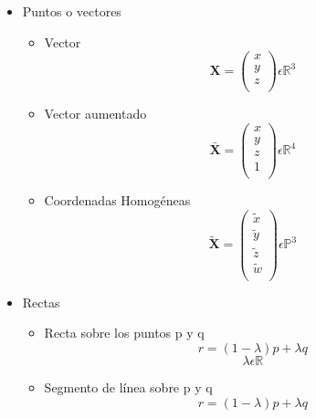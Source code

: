 \documentclass[main.tex]{subfiles}
\begin{document}
\begin{itemize}
\item Puntos o vectores
  \begin{itemize}
  \item Vector
    \begin{equation}
      \mathbf{X} = \left(
      \begin{array}{ccc}x \\y \\z \\\end{array} \right)
      \epsilon \mathbb{R}^{3}
    \end{equation}
  \item Vector aumentado
    \begin{equation}
      \mathbf{\bar{X}} = \left(
          \begin{array}{ccc}x \\y \\z \\1 \\
          \end{array}        \right) \epsilon \mathbb{R}^{4}
    \end{equation}
  \item Coordenadas Homogéneas
    \begin{equation}
      \mathbf{\tilde{X}} = \left(
          \begin{array}{ccc}
            \tilde{x} \\ \tilde{y} \\ \tilde{z} \\ \tilde{w} \\
          \end{array}
        \right) \epsilon \mathbb{P}^{3}
    \end{equation}
  \end{itemize}
\item Rectas
  \begin{itemize}
  \item Recta sobre los puntos p y q
    \begin{equation}
      r = (1-\lambda )p+\lambda q
    \end{equation}
    \begin{equation}
      \lambda \epsilon \mathbb{R}
    \end{equation}
  \item Segmento de línea sobre p y q
    \begin{equation}
      r = (1-\lambda )p+\lambda q
    \end{equation}

\end{itemize}
\end{itemize}
\end{document}
